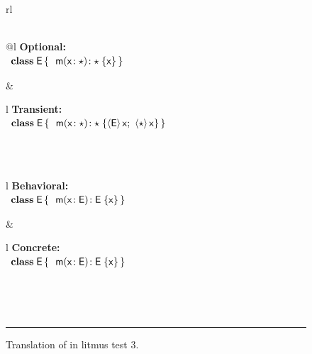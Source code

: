 \documentclass[USenglish]{tex/lipics-v2016}
\begin{document}
\begin{figure}[!h]\small
\hrulefill\\
\\
\begin{tabular}{rl}
\\[2mm]\\
\begin{tabular}{@{}l}
{\bf Optional:}\\[2mm]
\(\begin{array}{l@{\,}l}
\Class{\xt E}{}{&\Mdef\m\x{\any}{\any}\x } \\
\end{array}\) 
\end{tabular}&
\begin{tabular}{l}
{\bf Transient:}\\[2mm]
\(\begin{array}{l@{\,}l}
\Class{\xt E}{}{&\Mdef\m\x\any\any{\SubCast{\xt E}\x ; ~ \SubCast{\any}{\x}}} \\
\end{array}\)
\end{tabular}\\\\
\begin{tabular}{l}
{\bf Behavioral:}\\[2mm]
\(\begin{array}{l@{\,}l}
\Class{\xt E}{}{&\Mdef\m\x{\xt E}{\xt E}\x} \\
\end{array}\) 
\end{tabular} &
\begin{tabular}{l}
{\bf Concrete:}\\[2mm]
\(\begin{array}{l@{\,}l}
\Class{\xt E}{}{&\Mdef\m\x{\xt E}{\xt E}\x} \\
\end{array}\) 
\end{tabular}\\
\end{tabular}\vspace{2mm}\\
\hrule\vspace{4mm}
  
 \caption{Translation of  in litmus test 3.}  \label{fig:l3etrans}
\end{figure}
\end{document}
